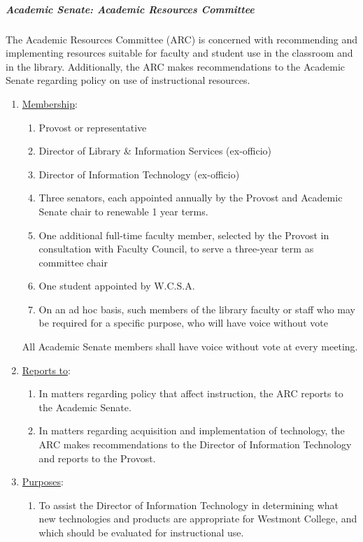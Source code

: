 				\subparagraph{Academic Senate:  Academic Resources Committee}
					The Academic Resources Committee (ARC) is concerned with recommending and implementing resources suitable for faculty and student use in the classroom and in the library.  Additionally, the ARC makes recommendations to the Academic Senate regarding policy on use of instructional resources.
					\begin{enumerate}[label=\alph*)]
						\item{\underline{Membership}:
							\begin{enumerate}[label=\arabic*)]
								\item{Provost or representative}
								\item{Director of Library \& Information Services (ex-officio)}
								\item{Director of Information Technology (ex-officio)}
								\item{Three senators, each appointed annually by the Provost and Academic Senate chair to renewable 1 year terms.}
								\item{One additional full-time faculty member, selected by the Provost in consultation with Faculty Council, to serve a three-year term as committee chair}
								\item{One student appointed by W.C.S.A.}
								\item{On an ad hoc basis, such members of the library faculty or staff who may be required for a specific purpose, who will have voice without vote}
							\end{enumerate}
							All Academic Senate members shall have voice without vote at every meeting.
						}
						\item{\underline{Reports to}:
							\begin{enumerate}[label=\arabic*)]
								\item{In matters regarding policy that affect instruction, the ARC reports to the Academic Senate.}
								\item{In matters regarding acquisition and implementation of technology, the ARC makes recommendations to the Director of Information Technology and reports to the Provost.}
							\end{enumerate}
						}
						\item{\underline{Purposes}:
							\begin{enumerate}[label=\arabic*)]
								\item{To assist the Director of Information Technology in determining what new technologies and products are appropriate for Westmont College, and which should be evaluated for instructional use.}

\end{enumerate}}
\end{enumerate}
